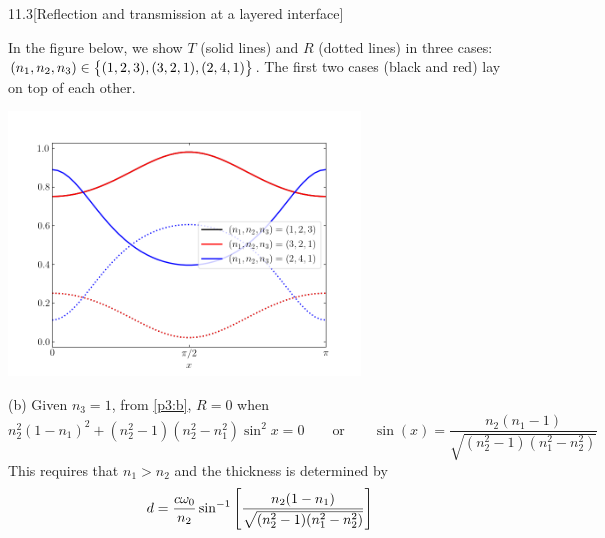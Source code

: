 \documentclass[12pt]{article}
\begin{document}
\begin{problem}{11.3}[Reflection and transmission at a layered interface]
\begin{solution}
In the figure below, we show $T$ (solid lines) and $R$ (dotted lines) in three
cases: $(n_1,n_2,n_3)\in\qty{(1,2,3),(3,2,1),(2,4,1)}$. The first two cases
(black and red) lay on top of each other.
\begin{center}
    \includegraphics[width=0.7\textwidth]{p3.png} 
\end{center}

(b) Given $n_3=1$, from \eqref{p3:b}, $R=0$ when
\begin{equation}
    n_2^2(1-n_1)^2+(n_2^2-1)(n_2^2-n_1^2)\sin^2x=0 
    \qquad\text{or}\qquad
    \sin(x)=\frac{n_2(n_1-1)}{\sqrt{(n_2^2-1)(n_1^2-n_2^2)}}
\end{equation}
This requires that $n_1>n_2$ and the thickness is determined by
\begin{equation}
    d=\frac{c\omega_0}{n_2}\sin^{-1}\qty[\frac{n_2(1-n_1)}{\sqrt{(n_2^2-1)(n_1^2-n_2^2)}}] 
\end{equation}
\end{solution}
\end{problem}
\end{document}
